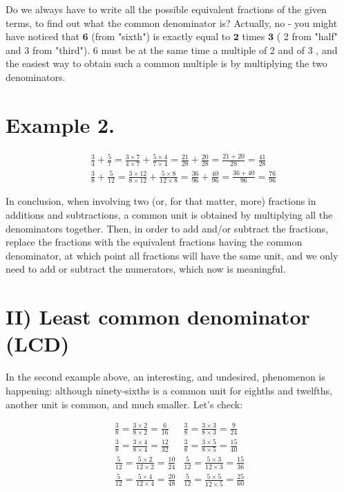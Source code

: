 \documentclass{ximera}
\begin{document}
Do we always have to write all the possible equivalent fractions of the given terms, to find out what the common denominator is? Actually, no - you might have noticed that $\mathbf{6}$ (from "sixth") is exactly equal to $\mathbf{2}$ times $\mathbf{3}$ ( 2 from "half" and 3 from "third"). 6 must be at the same time a multiple of 2 and of 3 , and the easiest way to obtain such a common multiple is by multiplying the two denominators.

\section*{Example 2.}
$$\begin{aligned}
& \frac{3}{4}+\frac{5}{7}=\frac{3 \times 7}{4 \times 7}+\frac{5 \times 4}{7 \times 4}=\frac{21}{28}+\frac{20}{28}=\frac{21+20}{28}=\frac{41}{28} \\
& \frac{3}{8}+\frac{5}{12}=\frac{3 \times 12}{8 \times 12}+\frac{5 \times 8}{12 \times 8}=\frac{36}{96}+\frac{40}{96}=\frac{36+40}{96}=\frac{76}{96}
\end{aligned}$$

In conclusion, when involving two (or, for that matter, more) fractions in additions and subtractions, a common unit is obtained by multiplying all the denominators together. Then, in order to add and/or subtract the fractions, replace the fractions with the equivalent fractions having the common denominator, at which point all fractions will have the same unit, and we only need to add or subtract the numerators, which now is meaningful.

\section*{II) Least common denominator (LCD)}
In the second example above, an interesting, and undesired, phenomenon is happening: although ninety-sixths is a common unit for eighths and twelfths, another unit is common, and much smaller. Let's check:

$$\begin{array}{ll}
\frac{3}{8}=\frac{3 \times 2}{8 \times 2}=\frac{6}{16} & \frac{3}{8}=\frac{3 \times 3}{8 \times 3}=\frac{9}{24} \\
\frac{3}{8}=\frac{3 \times 4}{8 \times 4}=\frac{12}{32} & \frac{3}{8}=\frac{3 \times 5}{8 \times 5}=\frac{15}{40} \\
\frac{5}{12}=\frac{5 \times 2}{12 \times 2}=\frac{10}{24} & \frac{5}{12}=\frac{5 \times 3}{12 \times 3}=\frac{15}{36} \\
\frac{5}{12}=\frac{5 \times 4}{12 \times 4}=\frac{20}{48} & \frac{5}{12}=\frac{5 \times 5}{12 \times 5}=\frac{25}{60}
\end{array}$$
\end{document}
